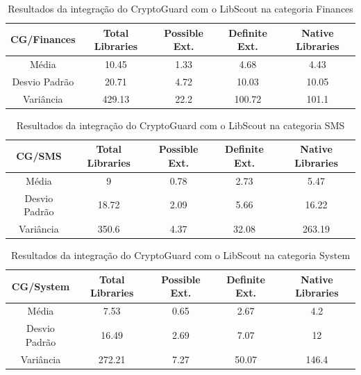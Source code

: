 \begin{table}[!htbp]
  \centering
  \small
  \begin{tabular}{|c|c|c|c|c|}
    \hline
    \textbf{CG/Finances} & \textbf{Total Libraries} & \textbf{Possible Ext.} & \textbf{Definite Ext.} & \textbf{Native Libraries} \\
    \hline
    Média & \num{10.45} & \num{1.33} & \num{4.68} & \num{4.43} \\
    Desvio Padrão & \num{20.71} & \num{4.72} & \num{10.03} & \num{10.05} \\
    Variância & \num{429.13} & \num{22.2} & \num{100.72} & \num{101.1} \\
    \hline
  \end{tabular}
  \caption{Resultados da integração do CryptoGuard com o LibScout na categoria Finances}
  \label{table: AplicativosComWarningCGF}
\end{table}


\begin{table}[!htbp]
  \centering
  \small
  \begin{tabular}{|c|c|c|c|c|}
    \hline
    \textbf{CG/SMS} & \textbf{Total Libraries} & \textbf{Possible Ext.} & \textbf{Definite Ext.} & \textbf{Native Libraries} \\
    \hline
    Média & \num{9} & \num{0.78} & \num{2.73} & \num{5.47} \\
    Desvio Padrão & \num{18.72} & \num{2.09} & \num{5.66} & \num{16.22} \\
    Variância & \num{350.6} & \num{4.37} & \num{32.08} & \num{263.19} \\
    \hline
  \end{tabular}
  \caption{Resultados da integração do CryptoGuard com o LibScout na categoria SMS}
  \label{table: AplicativosComWarningCGSMS}
\end{table}


\begin{table}[!htbp]
  \centering
  \small
  \begin{tabular}{|c|c|c|c|c|}
    \hline
    \textbf{CG/System} & \textbf{Total Libraries} & \textbf{Possible Ext.} & \textbf{Definite Ext.} & \textbf{Native Libraries} \\
    \hline
    Média & \num{7.53} & \num{0.65} & \num{2.67} & \num{4.2} \\
    Desvio Padrão & \num{16.49} & \num{2.69} & \num{7.07} & \num{12} \\
    Variância & \num{272.21} & \num{7.27} & \num{50.07} & \num{146.4} \\
    \hline
  \end{tabular}
  \caption{Resultados da integração do CryptoGuard com o LibScout na categoria System}
  \label{table: AplicativosComWarningCGS}
\end{table}

